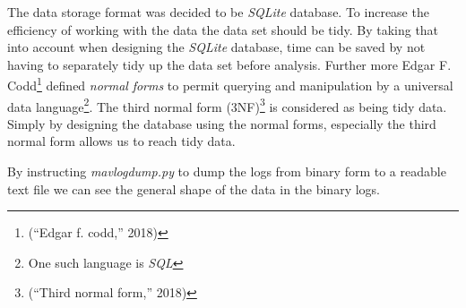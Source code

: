 \documentclass[12pt,oneside]{reedthesis}
\theoremstyle{definition}
\theoremstyle{definition}
\theoremstyle{definition}
\theoremstyle{remark}
\begin{document}
The data storage format was decided to be \emph{SQLite} database. To
increase the efficiency of working with the data the data set should be
tidy. By taking that into account when designing the \emph{SQLite}
database, time can be saved by not having to separately tidy up the data
set before analysis. Further more Edgar F. Codd\footnote{(``Edgar f.
  codd,'' 2018)} defined \emph{normal} \emph{forms} to permit querying
and manipulation by a universal data language\footnote{One such language
  is \emph{SQL}}. The third normal form (3NF)\footnote{(``Third normal
  form,'' 2018)} is considered as being tidy data. Simply by designing
the database using the normal forms, especially the third normal form
allows us to reach tidy data.

By instructing \emph{mavlogdump.py} to dump the logs from binary form to
a readable text file we can see the general shape of the data in the
binary logs.
\end{document}
